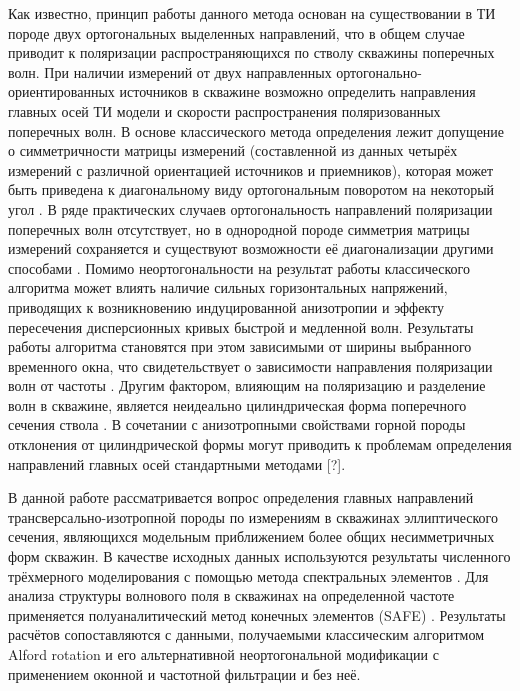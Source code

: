 \documentclass[a4paper,11pt]{article}
\begin{document}
Как известно, принцип работы данного метода основан на существовании в ТИ породе двух ортогональных выделенных направлений, что в общем случае приводит к поляризации распространяющихся по стволу скважины поперечных волн. При наличии измерений от двух направленных ортогонально-ориентированных источников в скважине возможно определить направления главных осей ТИ модели и скорости распространения поляризованных поперечных волн. В основе классического метода определения лежит допущение о симметричности матрицы измерений (составленной из данных четырёх измерений с различной ориентацией источников и приемников), которая может быть приведена к диагональному виду ортогональным поворотом на некоторый угол \cite{Alford1986}. В ряде практических случаев ортогональность направлений поляризации поперечных волн отсутствует, но в однородной породе симметрия матрицы измерений сохраняется и существуют возможности её диагонализации другими способами \cite{Dellinger1998}. Помимо неортогональности на результат работы классического алгоритма может влиять наличие сильных горизонтальных напряжений, приводящих к возникновению индуцированной анизотропии и эффекту пересечения дисперсионных кривых быстрой и медленной волн. Результаты работы алгоритма становятся при этом зависимыми от ширины выбранного временного окна, что свидетельствует о зависимости направления поляризации волн от частоты \cite{Nolte1997}. Другим фактором, влияющим на поляризацию и разделение волн в скважине, является неидеально цилиндрическая форма поперечного сечения ствола \cite{Seroices2010}. В сочетании с анизотропными свойствами горной породы отклонения от цилиндрической формы могут приводить к проблемам определения направлений главных осей стандартными методами [?].

В данной работе рассматривается вопрос определения главных направлений трансверсально-изотропной породы по измерениям в скважинах эллиптического сечения, являющихся модельным приближением более общих несимметричных форм скважин. В качестве исходных данных используются результаты численного трёхмерного моделирования с помощью метода спектральных элементов \cite{Komatitsch2000}. Для анализа структуры волнового поля в скважинах на определенной частоте применяется полуаналитический метод конечных элементов (SAFE) \cite{Bartoli2006}. Результаты расчётов сопоставляются с данными, получаемыми классическим алгоритмом Alford rotation \cite{Alford1986} и его альтернативной неортогональной модификации \cite{Dellinger1998} с применением оконной и частотной фильтрации и без неё.
\end{document}
